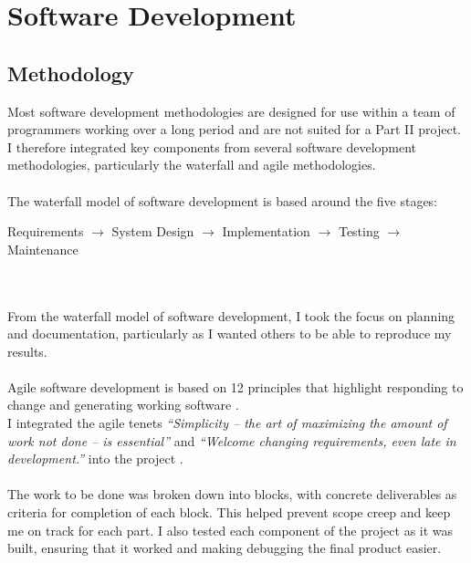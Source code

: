 \documentclass[12pt,a4paper]{report}
\begin{document}
\section{Software Development}
\subsection{Methodology}
Most software development methodologies are designed for use within a team of programmers working over a long period and are not suited for a 
Part II project. I therefore integrated key components from several software development methodologies, particularly the waterfall and agile methodologies. \\ \\
The waterfall model of software development is based around the five stages: \\
\centerline{Requirements $\rightarrow$ System Design $\rightarrow$ Implementation $\rightarrow$ Testing $\rightarrow$ Maintenance} \\ \\
From the waterfall model of software development, I took the focus on planning and documentation, particularly as I wanted others to be able to reproduce my results. \\ \\ 
Agile software development is based on 12 principles that highlight responding to change and generating working software \cite{agile}. \\
I integrated the agile tenets \emph{``Simplicity -- the art of maximizing the amount of work not done -- is essential''} and \emph{``Welcome changing requirements, even late in development.''} into the project \cite{agilep}.  \\ \\ 
The work to be done was broken down into blocks, with concrete deliverables as criteria for completion of each block. This helped prevent scope creep and keep me on track for each part. I also tested each component of the project as it was built, ensuring that it worked and making debugging the final product easier.
\end{document}
